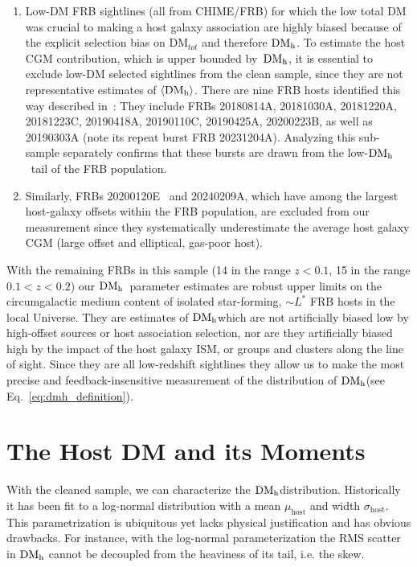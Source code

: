 \documentclass[twocolumn]{aastex631}
\newcommand{\muhost}{\mu_\textrm{host}}
\newcommand{\sighost}{\sigma_\textrm{host}}
\newcommand{\dmh}{\ensuremath{{\rm DM}_\textrm{h}}}
\begin{document}
\begin{enumerate}
    \item Low-DM FRB sightlines (all from CHIME/FRB) for which the low total DM was crucial to making a host galaxy association are highly biased because of the explicit selection bias on DM$_{tot}$ and therefore $\dmh$. To estimate the host CGM contribution, which is upper bounded by~\dmh, it is essential to exclude low-DM selected sightlines from the clean sample, since they are not representative estimates of $\langle \dmh \rangle$. There are nine FRB hosts identified this way described in~\citet{bhardwaj2024host,michilli2023subarcminute,Ibik2024host}: They include FRBs 20180814A, 20181030A, 20181220A, 20181223C, 20190418A, 20190110C, 20190425A, 20200223B, as well as 20190303A (note its repeat burst FRB 20231204A). Analyzing this sub-sample separately confirms that these bursts are drawn from the low-\dmh\ tail of the FRB population.
    \item Similarly, FRBs 20200120E~\citep{bhardwaj2021nearby, kirsten2022repeating} and 20240209A\citep{shah2024repeating,eftekhari2024massive}, which have among the largest host-galaxy offsets within the FRB population, are excluded from our measurement since they systematically underestimate the average host galaxy CGM (large offset and elliptical, gas-poor host).
\end{enumerate}

With the remaining FRBs in this sample (14 in the range $z < 0.1$, 15 in the range $0.1 < z < 0.2$) our \dmh\ parameter estimates are robust upper limits on the circumgalactic medium content of isolated star-forming, $\sim L^*$ FRB hosts in the local Universe. They are estimates of \dmh which are not artificially biased low by high-offset sources or host association selection, nor are they artificially biased high by the impact of the host galaxy ISM, or groups and clusters along the line of sight. Since they are all low-redshift sightlines they allow us to make the most precise and feedback-insensitive measurement of the distribution of \dmh (see Eq.~\ref{eq:dmh_definition}). 

\section{The Host DM and its Moments}\label{sec:moments}
With the cleaned sample, we can characterize the \dmh distribution. Historically it has been fit to a log-normal distribution with a mean $\muhost$ and width $\sighost$. This parametrization is ubiquitous \citep[e.g.,][]{macquart2020census,james2021z,baptista2024measuring} yet lacks physical justification and has obvious drawbacks. For instance, with the log-normal parameterization the RMS scatter in $\dmh$ cannot be decoupled from the heaviness of its tail, i.e. the skew.
\end{document}
